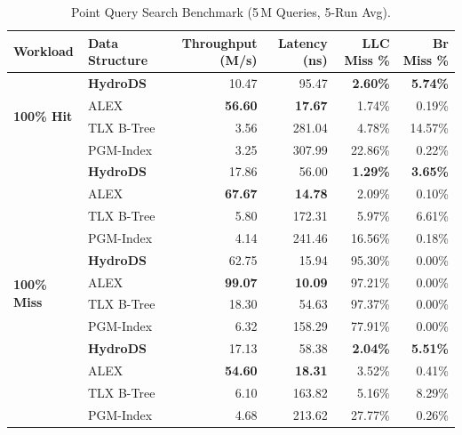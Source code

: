 \documentclass[10pt,twocolumn,letterpaper]{article}
\theoremstyle{definition}
\begin{document}
\begin{table}[H]
\centering
\caption{Point Query Search Benchmark (5\,M Queries, 5-Run Avg).}
\label{tab:search_summary}
\scriptsize\setlength{\tabcolsep}{2.8pt}
\renewcommand{\arraystretch}{1.08}
\begin{tabular}{@{}llrrrr@{}}
\toprule
\textbf{Workload} & \textbf{Data Structure} & \textbf{Throughput (M/s)} & \textbf{Latency (ns)} & \textbf{LLC Miss \%} & \textbf{Br Miss \%}\\
\midrule
\multirow{4}{*}{\textbf{100\% Hit}}
  & \textbf{HydroDS}    & 10.47 & 95.47 & \textbf{2.60\%} & \textbf{5.74\%}\\
  & ALEX                & \textbf{56.60} & \textbf{17.67} & 1.74\% & 0.19\%\\
  & TLX B-Tree          & 3.56 & 281.04 & 4.78\% & 14.57\%\\
  & PGM-Index           & 3.25 & 307.99 & 22.86\% & 0.22\%\\
\midrule
\rowcolor{rowgray}
\multirow{4}{*}{\textbf{50/50 Hit/Miss}}
  & \textbf{HydroDS}    & 17.86 & 56.00 & \textbf{1.29\%} & \textbf{3.65\%}\\
\rowcolor{rowgray}
  & ALEX                & \textbf{67.67} & \textbf{14.78} & 2.09\% & 0.10\%\\
\rowcolor{rowgray}
  & TLX B-Tree          & 5.80 & 172.31 & 5.97\% & 6.61\%\\
\rowcolor{rowgray}
  & PGM-Index           & 4.14 & 241.46 & 16.56\% & 0.18\%\\
\midrule
\multirow{4}{*}{\textbf{100\% Miss}}
  & \textbf{HydroDS}    & 62.75 & 15.94 & 95.30\% & 0.00\%\\
  & ALEX                & \textbf{99.07} & \textbf{10.09} & 97.21\% & 0.00\%\\
  & TLX B-Tree          & 18.30 & 54.63 & 97.37\% & 0.00\%\\
  & PGM-Index           & 6.32 & 158.29 & 77.91\% & 0.00\%\\
\midrule
\rowcolor{rowgray}
\multirow{4}{*}{\textbf{Zipfian Skew}}
  & \textbf{HydroDS}    & 17.13 & 58.38 & \textbf{2.04\%} & \textbf{5.51\%}\\
\rowcolor{rowgray}
  & ALEX                & \textbf{54.60} & \textbf{18.31} & 3.52\% & 0.41\%\\
\rowcolor{rowgray}
  & TLX B-Tree          & 6.10 & 163.82 & 5.16\% & 8.29\%\\
\rowcolor{rowgray}
  & PGM-Index           & 4.68 & 213.62 & 27.77\% & 0.26\%\\
\bottomrule
\end{tabular}
\end{table}
\end{document}
